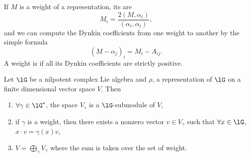 If $M$ is a weight of a representation, its  are
\begin{equation}
    M_i=\frac{ 2(M,\alpha_i) }{ (\alpha_i,\alpha_i) },
\end{equation}
and we can compute the Dynkin coefficients from one weight to another by the simple formula
\begin{equation}        \label{EqCofDynMmoisAlpha}
    (M-\alpha_j)_i=M_i-A_{ij}.
\end{equation}
A weight is  if all its Dynkin coefficients are strictly positive.

\begin{proposition}\label{prop:trois_poids}
    Let $\lG$ be a nilpotent complex Lie algebra and $\rho$, a representation of $\lG$ on a finite dimensional vector space $V$. Then
    \begin{enumerate}
        \item $\forall \gamma\in\lG^*$, the space $V_{\gamma}$ is a $\lG$-submodule of $V$,
        \item if $\gamma$ is a weight, then there exists a nonzero vector $v\in V_{\gamma}$ such that $\forall x\in\lG$, $x\cdot v=\gamma(x)v$,
        \label{prop:trois_poids:deux}
        \item\label{ItemVSEZlhviii} $V=\bigoplus_{\gamma}V_{\gamma}$ where the sum is taken over the set of weight.
    \end{enumerate}
\end{proposition}

